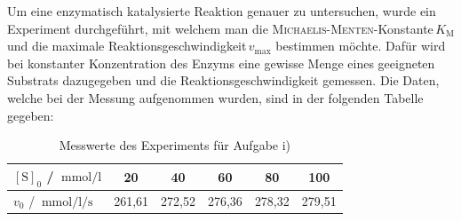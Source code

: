 \documentclass[../kl11.tex]{subfiles}
\begin{document}


Um eine enzymatisch katalysierte Reaktion genauer zu untersuchen, wurde ein Experiment durchgeführt, mit welchem man die \textsc{Michaelis-Menten}-Konstante\,$K_{\mathrm{M}}$ und die maximale Reaktionsgeschwindigkeit\,$v_{\mathrm{max}}$ bestimmen möchte. Dafür wird bei konstanter Konzentration des Enzyms eine gewisse Menge eines geeigneten Substrats dazugegeben und die Reaktionsgeschwindigkeit gemessen. Die Daten, welche bei der Messung aufgenommen wurden, sind in der folgenden Tabelle gegeben:
\begin{table}[H]
\centering
\begin{tabular}{|l|c|c|c|c|c|}
\hline
$[\mathrm{S}]_0$ / $\SI{}{\milli\mole\per\litre}$ & 20 & 40 & 60 & 80 & 100\\
\hline
$v_0$ / $\SI{}{\milli\mole\per\litre\per\second}$ & 261,61 & 272,52 & 276,36 & 278,32 & 279,51\\
\hline
\end{tabular}
\label{tbl.: Messwerte}
\caption{Messwerte des Experiments für Aufgabe i)}
\end{table}

\newpage
{}


\end{document}
